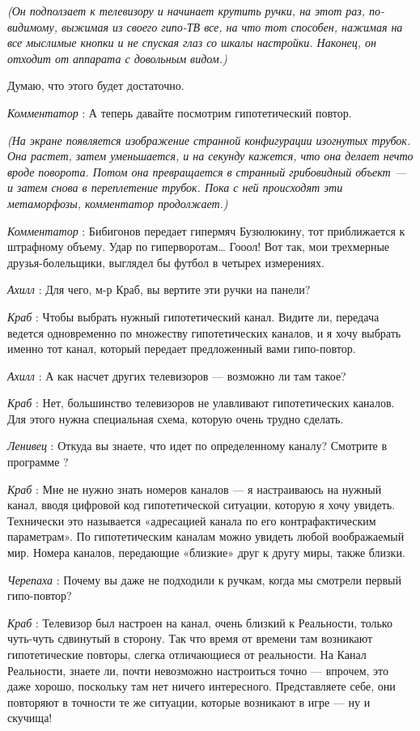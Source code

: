 \documentclass[../main.tex]{subfiles}
\begin{document}
\begin{dialogue}
\emph{(Он подползает к телевизору и начинает крутить ручки, на этот раз, по-видимому, выжимая из своего гипо-ТВ все, на что тот способен, нажимая на все мыслимые кнопки и не спуская глаз со шкалы настройки. Наконец, он отходит от аппарата с довольным видом.)}

Думаю, что этого будет достаточно.

\emph{Комментатор} : А теперь давайте посмотрим гипотетический повтор.

\emph{(На экране появляется изображение странной конфигурации изогнутых трубок. Она растет, затем уменьшается, и на секунду кажется, что она делает нечто вроде поворота. Потом она превращается в странный грибовидный объект --- и затем снова в переплетение трубок. Пока с ней происходят эти метаморфозы, комментатор продолжает.)}

\emph{Комментатор} : Бибигонов передает гипермяч Бузюлюкину, тот приближается к штрафному объему. Удар по гиперворотам\ldots{} Гооол! Вот так, мои трехмерные друзья-болельщики, выглядел бы футбол в четырех измерениях.

\emph{Ахилл} : Для чего, м-р Краб, вы вертите эти ручки на панели?

\emph{Краб} : Чтобы выбрать нужный гипотетический канал. Видите ли, передача ведется одновременно по множеству гипотетических каналов, и я хочу выбрать именно тот канал, который передает предложенный вами гипо-повтор.

\emph{Ахилл} : А как насчет других телевизоров --- возможно ли там такое?

\emph{Краб} : Нет, большинство телевизоров не улавливают гипотетических каналов. Для этого нужна специальная схема, которую очень трудно сделать.

\emph{Ленивец} : Откуда вы знаете, что идет по определенному каналу? Смотрите в программе ?

\emph{Краб} : Мне не нужно знать номеров каналов --- я настраиваюсь на нужный канал, вводя цифровой код гипотетической ситуации, которую я хочу увидеть. Технически это называется «адресацией канала по его контрафактическим параметрам». По гипотетическим каналам можно увидеть любой воображаемый мир. Номера каналов, передающие «близкие» друг к другу миры, также близки.

\emph{Черепаха} : Почему вы даже не подходили к ручкам, когда мы смотрели первый гипо-повтор?

\emph{Краб} : Телевизор был настроен на канал, очень близкий к Реальности, только чуть-чуть сдвинутый в сторону. Так что время от времени там возникают гипотетические повторы, слегка отличающиеся от реальности. На Канал Реальности, знаете ли, почти невозможно настроиться точно --- впрочем, это даже хорошо, поскольку там нет ничего интересного. Представляете себе, они повторяют в точности те же ситуации, которые возникают в игре --- ну и скучища!


\end{dialogue}
\end{document}
